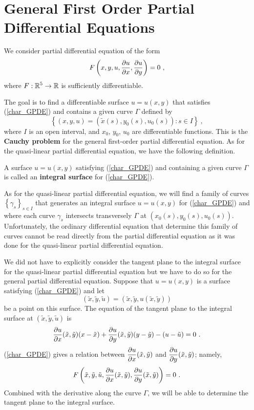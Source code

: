 \section{General First Order Partial Differential Equations}

We consider partial differential equation of the form
\begin{equation} \label{char_GPDE}
F\left(x,y,u,\frac{\partial{u}}{\partial x}, \frac{\partial{u}}{\partial y}\right) = 0 \ ,
\end{equation}
where $\displaystyle F:\mathbb{R}^5 \rightarrow \mathbb{R}$ is sufficiently differentiable.

The goal is to find a differentiable surface $u=u(x,y)$ that satisfies
(\ref{char_GPDE}) and contains a given curve $\Gamma$ defined by
\[
\left\{ (x,y,u) = (\tilde{x}(s) , y_0(s) , u_0(s)) : s \in I \right\} \ ,
\]
where $I$ is an open interval, and $x_0$, $y_0$, $u_0$ are
differentiable functions.  This is the
{\bfseries Cauchy problem}%
 for
the general first-order partial differential equation.  As for the
quasi-linear partial differential equation, we have the following definition.

\begin{defn}
A surface $u=u(x,y)$ satisfying (\ref{char_GPDE}) and containing a
given curve $\Gamma$ is called an
{\bfseries integral surface}%
for (\ref{char_GPDE}).
\end{defn}

As for the quasi-linear partial differential equation, we will find a family of curves
$\displaystyle \left\{ \gamma_s \right\}_{s\in I}$ that
generates an integral surface $u=u(x,y)$ for (\ref{char_GPDE}) and
where each curve $\gamma_s$ intersects transversely $\Gamma$ at
$(x_0(s),y_0(s),u_0(s))$.
Unfortunately, the ordinary differential equation that determine this
family of curves cannot be read directly from the partial differential
equation as it was done for the quasi-linear partial differential equation.

We did not have to explicitly consider the tangent plane to the
integral surface for the quasi-linear partial differential equation
but we have to do so for the general partial differential equation.
Suppose that $u=u(x,y)$ is a surface satisfying (\ref{char_GPDE}) and let
\[
(\tilde{x},\tilde{y},\tilde{u})
= \left(\tilde{x},\tilde{y},u(\tilde{x},\tilde{y})\right)
\]
be a point on this surface.  The equation of the tangent plane to the
integral surface at $(\tilde{x},\tilde{y},\tilde{u})$ is
\begin{equation} \label{char_tp_monge}
\pdydx{u}{x}(\tilde{x},\tilde{y})(x-\tilde{x})
+ \pdydx{u}{y}(\tilde{x},\tilde{y}) (y-\tilde{y}) - (u-\tilde{u}) = 0 \ .
\end{equation}
(\ref{char_GPDE}) gives a relation between
$\displaystyle \frac{\partial{u}}{\partial x}(\tilde{x},\tilde{y})$ and
$\displaystyle \frac{\partial{u}}{\partial y}(\tilde{x},\tilde{y})$; namely,
\[
F\left( \tilde{x}, \tilde{y}, \tilde{u}, \frac{\partial{u}}{\partial x}(\tilde{x},\tilde{y}),
\frac{\partial{u}}{\partial y}(\tilde{x},\tilde{y}) \right) = 0 \ .
\]
Combined with the derivative along the curve $\Gamma$, we will be able
to determine the tangent plane to the integral surface.

